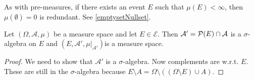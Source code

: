 As with pre-measures, if there exists an event $E$ such that $\mu(E)< \infty$, then $\mu(\emptyset) = 0$ is redundant. See \ref{emptysetNullset}.

\begin{lemma} \label{submeasurespace}
Let $(\Omega,\mathcal{A},\mu)$ be a measure space and let $E\in\mathcal{E}$. Then $\mathcal{A}' = \operatorname{\mathcal{P}}(E)\cap\mathcal{A}$ is a $\sigma$-algebra on $E$ and $(E,\mathcal{A}',\mu|_{\mathcal{A}'})$is a measure space.
\end{lemma}
\begin{proof}
We need to show that $\mathcal{A}'$ is a $\sigma$-algebra. Now complements are w.r.t. $E$. These are still in the $\sigma$-algebra because $E\setminus A = \Omega\setminus((\Omega\setminus E)\cup A)$.
\end{proof}

